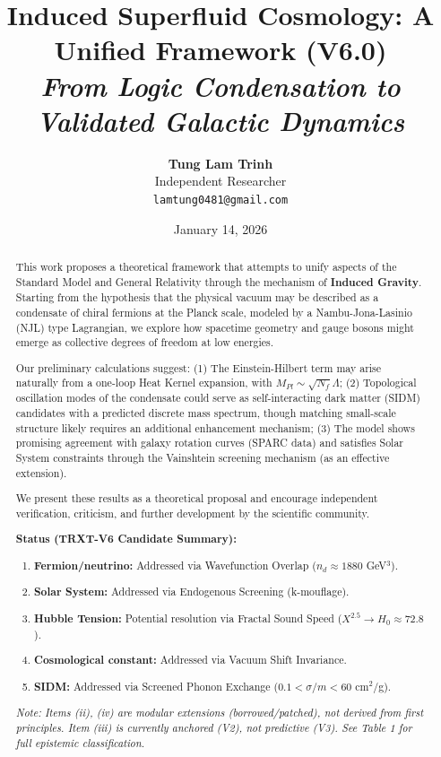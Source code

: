 \documentclass[a4paper,12pt]{article}
\title{\textbf{Induced Superfluid Cosmology: A Unified Framework (V6.0)}\\ \large \textit{From Logic Condensation to Validated Galactic Dynamics}}
\author{\textbf{Tung Lam Trinh} \\ Independent Researcher \\ \texttt{lamtung0481@gmail.com}}
\date{January 14, 2026}
\begin{document}
\maketitle

\begin{abstract}
This work proposes a theoretical framework that attempts to unify aspects of the Standard Model and General Relativity through the mechanism of \textbf{Induced Gravity}. Starting from the hypothesis that the physical vacuum may be described as a condensate of chiral fermions at the Planck scale, modeled by a Nambu-Jona-Lasinio (NJL) type Lagrangian, we explore how spacetime geometry and gauge bosons might emerge as collective degrees of freedom at low energies.

Our preliminary calculations suggest: (1) The Einstein-Hilbert term may arise naturally from a one-loop Heat Kernel expansion, with $M_{Pl} \sim \sqrt{N_f} \Lambda$; (2) Topological oscillation modes of the condensate could serve as self-interacting dark matter (SIDM) candidates with a predicted discrete mass spectrum, though matching small-scale structure likely requires an additional enhancement mechanism; (3) The model shows promising agreement with galaxy rotation curves (SPARC data) and satisfies Solar System constraints through the Vainshtein screening mechanism (as an effective extension).

We present these results as a theoretical proposal and encourage independent verification, criticism, and further development by the scientific community.

\begin{mdframed}[backgroundcolor=gray!20]
\textbf{Status (TRXT-V6 Candidate Summary):}
\begin{enumerate}
    \item[(i)] \textbf{Fermion/neutrino:} Addressed via Wavefunction Overlap ($n_d \approx 1880$ GeV$^3$).
    \item[(ii)] \textbf{Solar System:} Addressed via Endogenous Screening (k-mouflage).
    \item[(iii)] \textbf{Hubble Tension:} Potential resolution via Fractal Sound Speed ($X^{2.5} \to H_0 \approx 72.8$).
    \item[(iv)] \textbf{Cosmological constant:} Addressed via Vacuum Shift Invariance.
    \item[(v)] \textbf{SIDM:} Addressed via Screened Phonon Exchange ($0.1 < \sigma/m < 60$ cm$^2$/g).
\end{enumerate}
\textit{Note: Items (ii), (iv) are modular extensions (borrowed/patched), not derived from first principles. Item (iii) is currently anchored (V2), not predictive (V3). See Table 1 for full epistemic classification.}
\end{mdframed}
\end{abstract}
\end{document}
